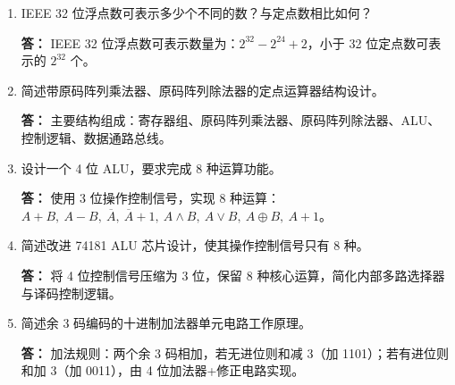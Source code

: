 \documentclass{article}
\begin{document}
\begin{enumerate}[label=\arabic*.]
    \textbf{答：}
    \begin{enumerate}[label=(\arabic*)]
        \item 1 10000011 01000000000000000000000 $\implies -20$
        \item 0 01111110 10000000000000000000000 $\implies 0.75$
    \end{enumerate}

    \item IEEE 32 位浮点数可表示多少个不同的数？与定点数相比如何？
    
    \textbf{答：}
    IEEE 32 位浮点数可表示数量为：$2^{32}-2^{24}+2$，小于 32 位定点数可表示的 $2^{32}$ 个。

    \item 简述带原码阵列乘法器、原码阵列除法器的定点运算器结构设计。
    
    \textbf{答：}
    主要结构组成：寄存器组、原码阵列乘法器、原码阵列除法器、ALU、控制逻辑、数据通路总线。

    \item 设计一个 4 位 ALU，要求完成 8 种运算功能。
    
    \textbf{答：}
    使用 3 位操作控制信号，实现 8 种运算：$A+B,\ A-B,\ \overline{A},\ \overline{A}+1,\ A\land B,\ A\lor B,\ A\oplus B,\ A+1$。

    \item 简述改进 74181 ALU 芯片设计，使其操作控制信号只有 8 种。
    
    \textbf{答：}
    将 4 位控制信号压缩为 3 位，保留 8 种核心运算，简化内部多路选择器与译码控制逻辑。

    \item 简述余 3 码编码的十进制加法器单元电路工作原理。
    
    \textbf{答：}
    加法规则：两个余 3 码相加，若无进位则和减 3（加 1101）；若有进位则和加 3（加 0011），由 4 位加法器+修正电路实现。

\end{enumerate}
\end{document}
